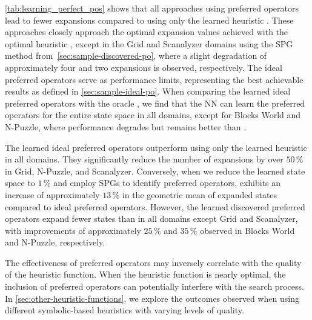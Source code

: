 \documentclass[ppgc,diss,english]{iiufrgs}
\begin{document}


\cref{tab:learning_perfect_pos} shows that all approaches using preferred operators lead to fewer expansions compared to using only the learned heuristic \hnn. These approaches closely approach the optimal expansion values achieved with the optimal heuristic \hstar, except in the Grid and Scanalyzer domains using the SPG method from~\cref{sec:sample-discovered-po}, where a slight degradation of approximately four and two expansions is observed, respectively. The ideal preferred operators serve as performance limits, representing the best achievable results as defined in \cref{sec:sample-ideal-po}. When comparing the learned ideal preferred operators \postar with the oracle \postartable, we find that the NN can learn the preferred operators for the entire state space in all domains, except for Blocks World and N-Puzzle, where performance degrades but remains better than \hnn.

The learned ideal preferred operators \postar outperform using only the learned heuristic \hnn in all domains. They significantly reduce the number of expansions by over $50\,\%$ in Grid, N-Puzzle, and Scanalyzer. Conversely, when we reduce the learned state space to $1\,\%$ and employ SPGs to identify preferred operators, \pog exhibits an increase of approximately $13\,\%$ in the geometric mean of expanded states compared to ideal preferred operators. However, the learned discovered preferred operators \pog expand fewer states than \hnn in all domains except Grid and Scanalyzer, with improvements of approximately $25\,\%$ and $35\,\%$ observed in Blocks World and N-Puzzle, respectively.

The effectiveness of preferred operators may inversely correlate with the quality of the heuristic function. When the heuristic function is nearly optimal, the inclusion of preferred operators can potentially interfere with the search process. In \cref{sec:other-heuristic-functions}, we explore the outcomes observed when using different symbolic-based heuristics with varying levels of quality.
\end{document}
